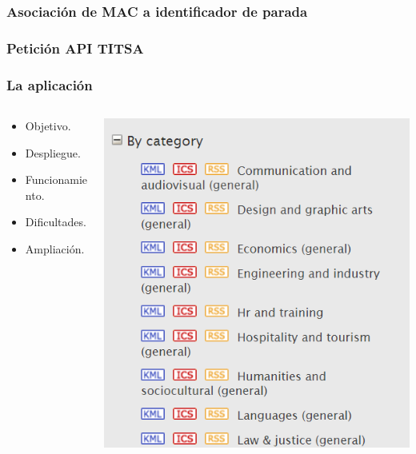 
\begin{frame}
	\frametitle{Asociación de MAC a identificador de parada}
	
\end{frame}


\begin{frame}
	\frametitle{Petición API TITSA}
	
\end{frame}


\begin{frame}
	\frametitle{La aplicación \ULLAR{}}
	\begin{columns}
		\begin{column}{0.6\textwidth}
			\begin{itemize}
				\item Objetivo.
				\item Despliegue.
				\item Funcionamiento.
				\item Dificultades.
				\item Ampliación.
			\end{itemize}
			\endblock{}
		\end{column}
		\begin{column}{0.4\textwidth}
			\vfill 
			\begin{center}
				\includegraphics[width=0.7\linewidth]{Images/eventsRss}
			\end{center}
		\end{column}
	\end{columns}
\end{frame}

